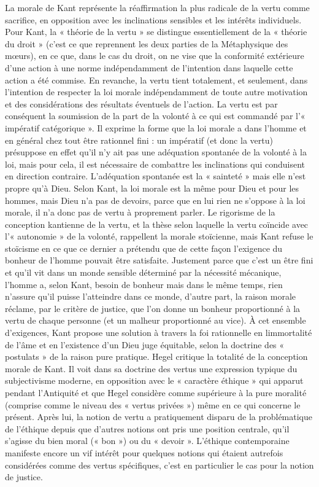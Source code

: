 La morale de Kant représente la réaffirmation
la plus radicale de la vertu
comme sacrifice, en opposition avec les
inclinations sensibles et les intérêts individuels.
Pour Kant, la « théorie de la vertu »
se distingue essentiellement de la « théorie
du droit » (c’est ce que reprennent les
deux parties de la Métaphysique des
mœurs), en ce que, dans le cas du droit,
on ne vise que la conformité extérieure
d’une action à une norme indépendamment
de l'intention dans laquelle cette
action a été commise. En revanche, la
vertu tient totalement, et seulement, dans
l'intention de respecter la loi morale indépendamment
de toute autre motivation et
des considérations des résultats éventuels
de l’action. La vertu est par conséquent la
soumission de la part de la volonté à ce
qui est commandé par l’« impératif catégorique ».
Il exprime la forme que la loi
morale a dans l’homme et en général chez
tout être rationnel fini : un impératif (et
donc la vertu) présuppose en effet qu’il
n’y ait pas une adéquation spontanée de
la volonté à la loi, mais pour cela, il est
nécessaire de combattre les inclinations
qui conduisent en direction contraire.
L’adéquation spontanée est la « sainteté »
mais elle n’est propre qu'à Dieu. Selon
Kant, la loi morale est la même pour Dieu
et pour les hommes, mais Dieu n’a pas de
devoirs, parce que en lui rien ne s'oppose
à la loi morale, il n’a donc pas de vertu
à proprement parler. Le rigorisme de la
conception kantienne de la vertu, et la
thèse selon laquelle la vertu coïncide avec
l’« autonomie » de la volonté, rappellent
la morale stoïcienne, mais Kant refuse le
stoïcisme en ce que ce dernier a prétendu
que de cette façon l’exigence du bonheur
de l’homme pouvait être satisfaite. Justement
parce que c’est un être fini et qu’il
vit dans un monde sensible déterminé par
la nécessité mécanique, l’homme a, selon
Kant, besoin de bonheur mais dans le
même temps, rien n’assure qu’il puisse
l’atteindre dans ce monde, d’autre part, la
raison morale réclame, par le critère de
justice, que l’on donne un bonheur proportionné
à la vertu de chaque personne
(et un malheur proportionné au vice). À
cet ensemble d’exigences, Kant propose
une solution à travers la foi rationnelle en
limmortalité de l’âme et en l’existence
d’un Dieu juge équitable, selon la doctrine
des « postulats » de la raison pure
pratique. Hegel critique la totalité de la
conception morale de Kant. Il voit dans
sa doctrine des vertus une expression
typique du subjectivisme moderne, en
opposition avec le « caractère éthique »
qui apparut pendant l’Antiquité et que
Hegel considère comme supérieure à la
pure moralité (comprise comme le niveau
des « vertus privées ») même en ce qui
concerne le présent. Après lui, la notion
de vertu a pratiquement disparu de la
problématique de l’éthique depuis que
d’autres notions ont pris une position centrale,
qu’il s'agisse du bien moral
(« bon ») ou du « devoir ». L’éthique
contemporaine manifeste encore un vif
intérêt pour quelques notions qui étaient
autrefois considérées comme des vertus
spécifiques, c’est en particulier le cas pour
la notion de justice.

